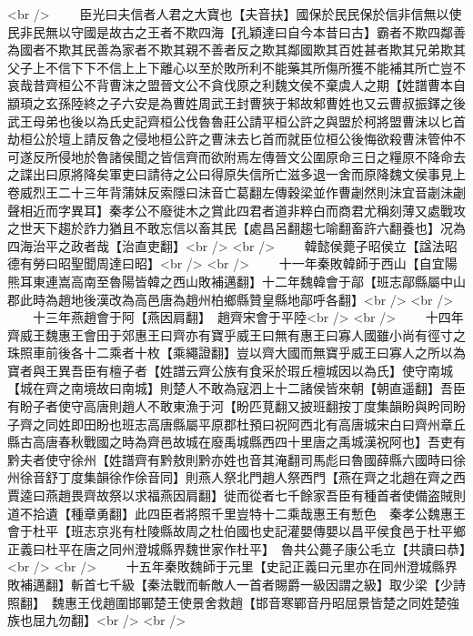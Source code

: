 <br />
　　臣光曰夫信者人君之大寶也【夫音扶】國保於民民保於信非信無以使民非民無以守國是故古之王者不欺四海【孔穎達曰自今本昔曰古】霸者不欺四鄰善為國者不欺其民善為家者不欺其親不善者反之欺其鄰國欺其百姓甚者欺其兄弟欺其父子上不信下下不信上上下離心以至於敗所利不能藥其所傷所獲不能補其所亡豈不哀哉昔齊桓公不背曹沫之盟晉文公不貪伐原之利魏文侯不棄虞人之期【姓譜曹本自顓頊之玄孫陸終之子六安是為曹姓周武王封曹狹于邾故邾曹姓也又云曹叔振鐸之後武王母弟也後以為氏史記齊桓公伐魯魯莊公請平桓公許之與盟於柯將盟曹沫以匕首劫桓公於壇上請反魯之侵地桓公許之曹沬去匕首而就臣位桓公後悔欲殺曹沬管仲不可遂反所侵地於魯諸侯聞之皆信齊而欲附焉左傳晉文公圍原命三日之糧原不降命去之諜出曰原將降矣軍吏曰請待之公曰得原失信所亡滋多退一舍而原降魏文侯事見上卷威烈王二十三年背蒲妺反索隱曰沬音亡葛翻左傳穀梁並作曹劌然則沬宜音劌沬劌聲相近而字異耳】秦孝公不廢徙木之賞此四君者道非粹白而商君尤稱刻薄又處戰攻之世天下趨於詐力猶且不敢忘信以畜其民【處昌呂翻趨七喻翻畜許六翻養也】况為四海治平之政者哉【治直吏翻】<br />
<br />
　　韓懿侯薨子昭侯立【諡法昭德有勞曰昭聖聞周達曰昭】<br />
<br />
　　十一年秦敗韓師于西山【自宜陽熊耳東連嵩高南至魯陽皆韓之西山敗補邁翻】十二年魏韓會于鄗【班志鄗縣屬中山郡此時為趙地後漢改為高邑唐為趙州柏鄉縣贊皇縣地鄗呼各翻】<br />
<br />
　　十三年燕趙會于阿【燕因肩翻】　趙齊宋會于平陸<br />
<br />
　　十四年齊威王魏惠王會田于郊惠王曰齊亦有寶乎威王曰無有惠王曰寡人國雖小尚有徑寸之珠照車前後各十二乘者十枚【乘繩證翻】豈以齊大國而無寶乎威王曰寡人之所以為寶者與王異吾臣有檀子者【姓譜云齊公族有食采於瑕丘檀城因以為氏】使守南城【城在齊之南境故曰南城】則楚人不敢為寇泗上十二諸侯皆來朝【朝直遥翻】吾臣有盼子者使守高唐則趙人不敢東漁于河【盼匹莧翻又披班翻按丁度集韻盼與盻同盼子齊之同姓即田盼也班志高唐縣屬平原郡杜預曰祝阿西北有高唐城宋白曰齊州章丘縣古高唐春秋戰國之時為齊邑故城在廢禹城縣西四十里唐之禹城漢祝阿也】吾吏有黔夫者使守徐州【姓譜齊有黔敖則黔亦姓也音其淹翻司馬彪曰魯國薛縣六國時曰徐州徐音舒丁度集韻徐作俆音同】則燕人祭北門趙人祭西門【燕在齊之北趙在齊之西賈逵曰燕趙畏齊故祭以求福燕因肩翻】徙而從者七千餘家吾臣有種首者使備盗賊則道不拾遺【種章勇翻】此四臣者將照千里豈特十二乘哉惠王有慙色　秦孝公魏惠王會于杜平【班志京兆有杜陵縣故周之杜伯國也史記灌嬰傳嬰以昌平侯食邑于杜平鄉正義曰杜平在唐之同州澄城縣界魏世家作杜平】　魯共公薨子康公毛立【共讀曰恭】<br />
<br />
　　十五年秦敗魏師于元里【史記正義曰元里亦在同州澄城縣界敗補邁翻】斬首七千級【秦法戰而斬敵人一首者賜爵一級因謂之級】取少梁【少詩照翻】　魏惠王伐趙圍邯鄲楚王使景舍救趙【邯音寒鄲音丹昭屈景皆楚之同姓楚強族也屈九勿翻】<br />
<br />

